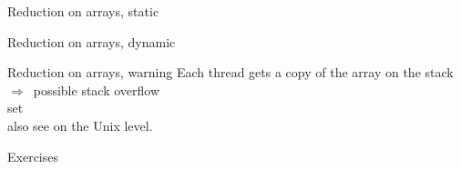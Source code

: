 \begin{numberedframe}{Reduction on arrays, static}
\end{numberedframe}

\begin{numberedframe}{Reduction on arrays, dynamic}
\end{numberedframe}

\begin{numberedframe}{Reduction on arrays, warning}
  Each thread gets a copy of the array on the stack\\
  $\Rightarrow$~possible stack overflow\\
  set \\
  also see  on the Unix level.
\end{numberedframe}

\begin{exerciseframe}[pi]
  \footnotesize
  
\end{exerciseframe}



 {Exercises}

\begin{exerciseframe}[jacobi]
  
\end{exerciseframe}

\begin{exerciseframe}
  
\end{exerciseframe}

\begin{exerciseframe}
  
\end{exerciseframe}

\begin{exerciseframe}
  
\end{exerciseframe}

\endinput

\begin{numberedframe}{}
\begin{lstlisting}
\end{lstlisting}
  \begin{itemize}
  \item 
  \end{itemize}
\end{numberedframe}


